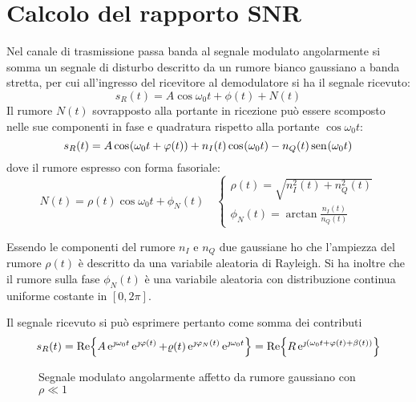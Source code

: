 \section{Calcolo del rapporto \ac{SNR}}
Nel canale di trasmissione passa banda al segnale modulato angolarmente si somma un segnale di disturbo descritto da un rumore bianco gaussiano a banda stretta, per cui all'ingresso del ricevitore al demodulatore si ha il segnale ricevuto:
\begin{equation}
s_R(t)=A\cos{\omega_0 t+\phi(t)}+N(t)
\end{equation}
Il rumore $N(t)$ sovrapposto alla portante in ricezione può essere scomposto nelle sue componenti in fase e quadratura rispetto alla portante $\cos{\omega_0 t}$:
\begin{equation}
s_R(t)=A\,{\operatorname{cos}}^{}\!\left({\omega_0 t+\varphi(t)}\right)+n_I(t)\,{\operatorname{cos}}^{}\!\left({\omega_0 t}\right)-n_Q(t)\,{\operatorname{sen}}^{}\!\left({\omega_0 t}\right)
\end{equation}
dove il rumore espresso con forma fasoriale:
\begin{equation}
N(t)=\rho(t)\cos{\omega_0 t+\phi_N(t)}\quad\begin{cases}
\rho(t)=\sqrt{n_I^2(t)+n_Q^2(t)}\\\phi_N(t)=\arctan\frac{n_I(t)}{n_Q(t)}\end{cases}
\end{equation}

Essendo le componenti del rumore $n_I$ e $n_Q$ due gaussiane ho che l'ampiezza del rumore $\rho(t)$ è descritto da una variabile aleatoria di Rayleigh.
Si ha inoltre che il rumore sulla fase $\phi_N(t)$ è una variabile aleatoria con distribuzione continua uniforme costante in $[0,2\pi]$.
 
Il segnale ricevuto si può esprimere pertanto come somma dei contributi
\begin{equation}
s_R(t)=\operatorname{Re}\!\left\lbrace{A\operatorname{e}^{\jmath\omega_0 t}\operatorname{e}^{\jmath\varphi(t)}+\varrho(t)\operatorname{e}^{\jmath\varphi_N(t)}\operatorname{e}^{\jmath\omega_0 t}}\right\rbrace=\operatorname{Re}\!\left\lbrace{R\operatorname{e}^{\jmath(\omega_0 t+\varphi(t)+\beta(t))}}\right\rbrace
\end{equation}
\begin{figure}[!ht]\centering
{}
\caption{Segnale modulato angolarmente affetto da rumore gaussiano con $\rho\ll 1$}\label{fig:segnale_modulato_angolarmente_affetto_da_rumore}
\end{figure}

